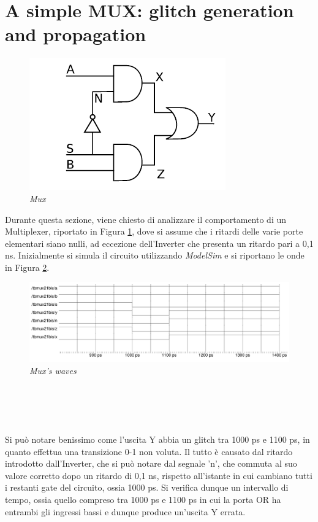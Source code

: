 \section{A simple MUX: glitch generation and propagation}
\begin{figure}[!htb]
	\centering
	\includegraphics[scale=0.8]{immagini/mux}
	\caption{\textit{Mux}}
	\label{mux}
\end{figure}
\noindent Durante questa sezione, viene chiesto di analizzare il comportamento di un Multiplexer, riportato in Figura \ref{mux}, dove si assume che i ritardi delle varie porte elementari siano nulli, ad eccezione dell'Inverter che presenta un ritardo pari a 0,1 ns. Inizialmente si simula il circuito utilizzando \textit{ModelSim} e si riportano le onde in Figura \ref{model_mux}.
\begin{figure}[!htb]
	\centering
	\includegraphics[scale=0.25]{immagini/model_mux}
	\caption{\textit{Mux's waves}}
	\label{model_mux}
\end{figure}
\\
\\
\\
\\
Si può notare benissimo come l'uscita Y abbia un glitch tra 1000 ps e 1100 ps, in quanto effettua una transizione 0-1 non voluta. Il tutto è causato dal ritardo introdotto dall'Inverter, che si può notare dal segnale 'n', che commuta al suo valore corretto dopo un ritardo di 0,1 ns, rispetto all'istante in cui cambiano tutti i restanti gate del circuito, ossia 1000 ps. Si verifica dunque un intervallo di tempo, ossia quello compreso tra 1000 ps e 1100 ps in cui la porta OR ha entrambi gli ingressi bassi e dunque produce un'uscita Y errata. \\
